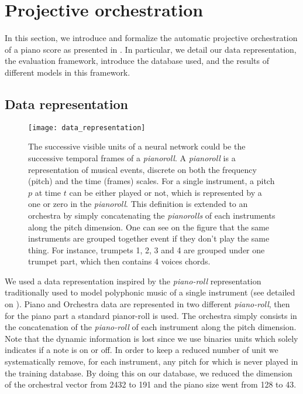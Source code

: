 \documentclass[letterpaper]{article}
\begin{document}
\section{Projective orchestration}
In this section, we introduce and formalize the automatic projective orchestration of a piano score as presented in . In particular, we detail our data representation, the evaluation framework, introduce the database used, and the results of different models in this framework.

\subsection{Data representation}
\label{sec:data_representation}
\begin{figure}
\centering
\texttt{[image: data\_representation]}
\caption{The successive visible units of a neural network could be the successive temporal frames of a \textit{pianoroll}. A \textit{pianoroll} is a representation of musical events, discrete on both the frequency (pitch) and the time (frames) scales. For a single instrument, a pitch $p$ at time $t$ can be either played or not, which is represented by a one or zero in the \textit{pianoroll}. This definition is extended to an orchestra by simply concatenating the \textit{pianorolls} of each instruments along the pitch dimension. One can see on the figure that the same instruments are grouped together event if they don't play the same thing. For instance, trumpets 1, 2, 3 and 4 are grouped under one trumpet part, which then contains 4 voices chords.}
\label{fig:pianoroll}
\end{figure}
We used a data representation inspired by the \textit{piano-roll} representation traditionally used to model polyphonic music of a single instrument (see detailed on ). Piano and Orchestra data are represented in two different \textit{piano-roll}, then for the piano part a standard pianor-roll is used. The orchestra simply consists in the concatenation of the \textit{piano-roll} of each instrument along the pitch dimension. Note that the dynamic 	information is lost since we use binaries units which solely indicates if a note is on or off. In order to keep a reduced number of unit we systematically remove, for each instrument, any pitch for which is never played in the training database. By doing this on our database, we reduced the dimension of the orchestral vector from 2432 to 191 and the piano size went from 128 to 43.
\end{document}
